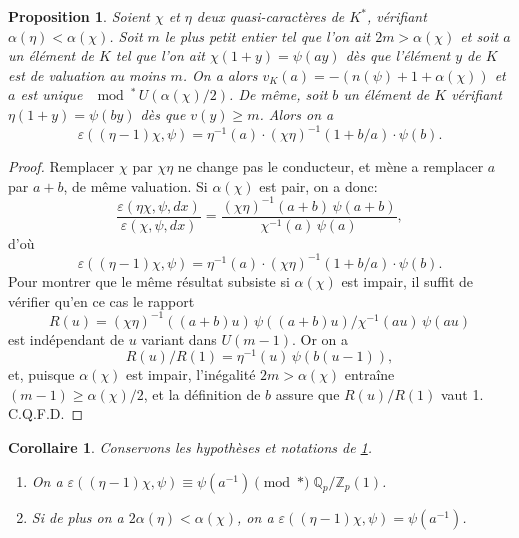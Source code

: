 \documentclass[12pt,a4paper]{article}
\theoremstyle{plain}
\newtheorem{proposition}[theorem]{Proposition}
\newtheorem{corollary}[theorem]{Corollaire}
\theoremstyle{definition}
\theoremstyle{remark}
\newcommand{\bQ}{\mathbb{Q}}
\newcommand{\bZ}{\mathbb{Z}}
\begin{document}
\begin{proposition}\label{prop:1.1}
Soient $\chi$ et $\eta$ deux quasi-caract\`eres de $K^*$, v\'erifiant $\alpha(\eta) < \alpha(\chi)$. Soit $m$ le plus petit entier tel que l'on ait $2m > \alpha(\chi)$ et soit $a$ un \'el\'ement de $K$ tel que l'on ait $\chi(1+y) = \psi(ay)$ d\`es que l'\'el\'ement $y$ de $K$ est de valuation au moins $m$. On a alors $v_K(a) = -(n(\psi) + 1 + \alpha(\chi))$ et $a$ est unique $\mod^*\, U(\alpha(\chi)/2)$. De m\^eme, soit $b$ un \'el\'ement de $K$ v\'erifiant $\eta(1+y) = \psi(by)$ d\`es que $v(y) \geq m$. Alors on a
\begin{equation}\label{eq:1.1.1}
\varepsilon((\eta-1)\chi, \psi) = \eta^{-1}(a) \cdot (\chi\eta)^{-1}(1+b/a) \cdot \psi(b).
\end{equation}
\end{proposition}

\begin{proof}
Remplacer $\chi$ par $\chi\eta$ ne change pas le conducteur, et m\`ene a remplacer $a$ par $a+b$, de m\^eme valuation. Si $\alpha(\chi)$ est pair, on a donc:
\[
\frac{\varepsilon(\eta\chi, \psi, dx)}{\varepsilon(\chi, \psi, dx)} = \frac{(\chi\eta)^{-1}(a+b) \, \psi(a+b)}{\chi^{-1}(a) \, \psi(a)},
\]
d'o\`u
\[
\varepsilon((\eta-1)\chi, \psi) = \eta^{-1}(a) \cdot (\chi\eta)^{-1}(1+b/a) \cdot \psi(b).
\]
Pour montrer que le m\^eme r\'esultat subsiste si $\alpha(\chi)$ est impair, il suffit de v\'erifier qu'en ce cas le rapport
\[
R(u) = (\chi\eta)^{-1}((a+b)u) \, \psi((a+b)u) \big/ \chi^{-1}(au) \, \psi(au)
\]
est ind\'ependant de $u$ variant dans $U(m-1)$. Or on a
\[
R(u)/R(1) = \eta^{-1}(u) \, \psi(b(u-1)),
\]
et, puisque $\alpha(\chi)$ est impair, l'in\'egalit\'e $2m > \alpha(\chi)$ entra\^ine $(m-1) \geq \alpha(\chi)/2$, et la d\'efinition de $b$ assure que $R(u)/R(1)$ vaut 1. C.Q.F.D.
\end{proof}

\begin{corollary}\label{cor:1.3}
Conservons les hypoth\`eses et notations de \ref{prop:1.1}.
\begin{enumerate}[label=(\roman*)]
\item On a $\varepsilon((\eta-1)\chi, \psi) \equiv \psi(a^{-1}) \pmod{*} \;\bQ_p/\bZ_p(1)$.
\item Si de plus on a $2\alpha(\eta) < \alpha(\chi)$, on a $\varepsilon((\eta-1)\chi, \psi) = \psi(a^{-1})$.
\end{enumerate}
\end{corollary}
\end{document}
